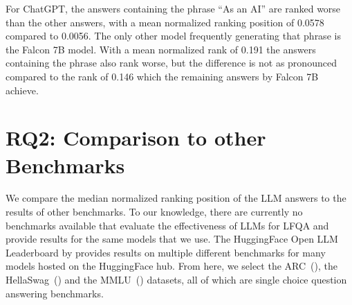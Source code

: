For ChatGPT, the answers containing the phrase ``As an AI'' are ranked worse than the other answers, with a mean normalized ranking position of 0.0578 compared to 0.0056.
The only other model frequently generating that phrase is the Falcon 7B model.
With a mean normalized rank of 0.191 the answers containing the phrase also rank worse, but the difference is not as pronounced compared to the rank of 0.146 which the remaining answers by Falcon 7B achieve.

\section{RQ2: Comparison to other Benchmarks}\label{sec:benchmark_comparison}
We compare the median normalized ranking position of the LLM answers to the results of other benchmarks.
To our knowledge, there are currently no benchmarks available that evaluate the effectiveness of LLMs for LFQA and provide results for the same models that we use.
The HuggingFace Open LLM Leaderboard by \cite{beeching:2023:Open} provides results on multiple different benchmarks for many models hosted on the HuggingFace hub.
From here, we select the ARC~(\cite{clark:2018:Think}), the HellaSwag~(\cite{zellers:2019:HellaSwag}) and the MMLU~(\cite{hendrycks:2020:Measuring}) datasets, all of which are single choice question answering benchmarks.
